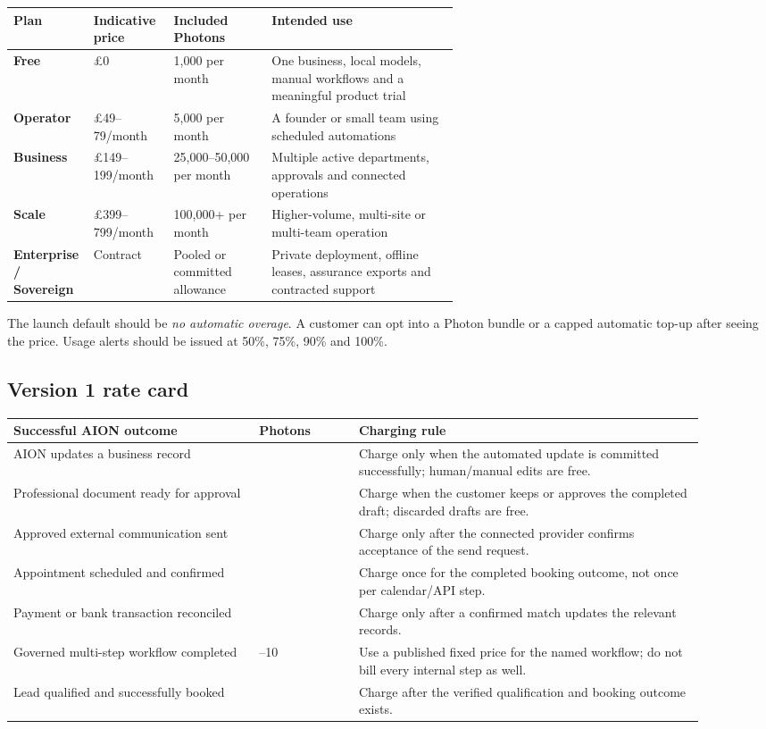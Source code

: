 \documentclass[11pt]{article}
\begin{document}
\begin{center}
\begin{tabularx}{\linewidth}{>{\bfseries}p{0.18\linewidth} p{0.18\linewidth} p{0.22\linewidth} X}
\toprule
Plan & Indicative price & Included Photons & Intended use \\
\midrule
Free & \pounds 0 & 1,000 per month & One business, local models, manual workflows and a meaningful product trial \\
Operator & \pounds 49--79/month & 5,000 per month & A founder or small team using scheduled automations \\
Business & \pounds 149--199/month & 25,000--50,000 per month & Multiple active departments, approvals and connected operations \\
Scale & \pounds 399--799/month & 100,000+ per month & Higher-volume, multi-site or multi-team operation \\
Enterprise / Sovereign & Contract & Pooled or committed allowance & Private deployment, offline leases, assurance exports and contracted support \\
\bottomrule
\end{tabularx}
\end{center}

The launch default should be \emph{no automatic overage}. A customer can opt into a Photon bundle or a capped automatic top-up after seeing the price. Usage alerts should be issued at 50\%, 75\%, 90\% and 100\%.

\subsection{Version 1 rate card}

\begin{longtable}{>{\raggedright\arraybackslash}p{0.32\linewidth} >{\centering\arraybackslash}p{0.13\linewidth} p{0.45\linewidth}}
\toprule
Successful AION outcome & Photons & Charging rule \\
\midrule
\endhead
AION updates a business record & 1 & Charge only when the automated update is committed successfully; human/manual edits are free. \\
Professional document ready for approval & 2 & Charge when the customer keeps or approves the completed draft; discarded drafts are free. \\
Approved external communication sent & 3 & Charge only after the connected provider confirms acceptance of the send request. \\
Appointment scheduled and confirmed & 3 & Charge once for the completed booking outcome, not once per calendar/API step. \\
Payment or bank transaction reconciled & 5 & Charge only after a confirmed match updates the relevant records. \\
Governed multi-step workflow completed & 5--10 & Use a published fixed price for the named workflow; do not bill every internal step as well. \\
Lead qualified and successfully booked & 10 & Charge after the verified qualification and booking outcome exists. \\
\bottomrule
\end{longtable}
\end{document}
